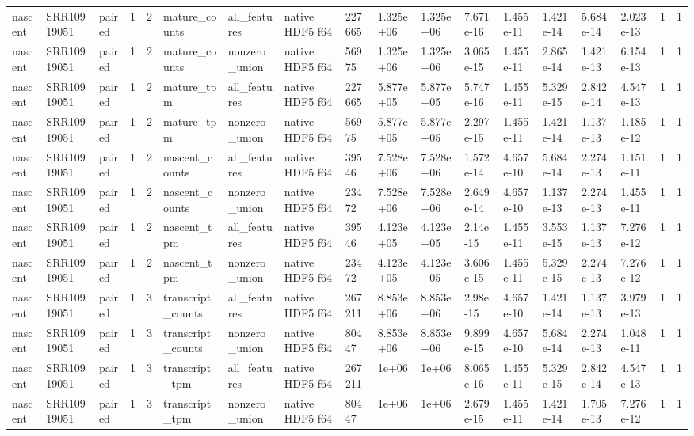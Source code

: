 \begin{tabular}{llllllllllllllllll}
nascent & SRR10919051 & paired & 1 & 2 & mature\_counts & all\_features & native HDF5 f64 & 227665 & 1.325e+06 & 1.325e+06 & 7.671e-16 & 1.455e-11 & 1.421e-14 & 5.684e-14 & 2.023e-13 & 1 & 1 \\
nascent & SRR10919051 & paired & 1 & 2 & mature\_counts & nonzero\_union & native HDF5 f64 & 56975 & 1.325e+06 & 1.325e+06 & 3.065e-15 & 1.455e-11 & 2.865e-14 & 1.421e-13 & 6.154e-13 & 1 & 1 \\
nascent & SRR10919051 & paired & 1 & 2 & mature\_tpm & all\_features & native HDF5 f64 & 227665 & 5.877e+05 & 5.877e+05 & 5.747e-16 & 1.455e-11 & 5.329e-15 & 2.842e-14 & 4.547e-13 & 1 & 1 \\
nascent & SRR10919051 & paired & 1 & 2 & mature\_tpm & nonzero\_union & native HDF5 f64 & 56975 & 5.877e+05 & 5.877e+05 & 2.297e-15 & 1.455e-11 & 1.421e-14 & 1.137e-13 & 1.185e-12 & 1 & 1 \\
nascent & SRR10919051 & paired & 1 & 2 & nascent\_counts & all\_features & native HDF5 f64 & 39546 & 7.528e+06 & 7.528e+06 & 1.572e-14 & 4.657e-10 & 5.684e-14 & 2.274e-13 & 1.151e-11 & 1 & 1 \\
nascent & SRR10919051 & paired & 1 & 2 & nascent\_counts & nonzero\_union & native HDF5 f64 & 23472 & 7.528e+06 & 7.528e+06 & 2.649e-14 & 4.657e-10 & 1.137e-13 & 2.274e-13 & 1.455e-11 & 1 & 1 \\
nascent & SRR10919051 & paired & 1 & 2 & nascent\_tpm & all\_features & native HDF5 f64 & 39546 & 4.123e+05 & 4.123e+05 & 2.14e-15 & 1.455e-11 & 3.553e-15 & 1.137e-13 & 7.276e-12 & 1 & 1 \\
nascent & SRR10919051 & paired & 1 & 2 & nascent\_tpm & nonzero\_union & native HDF5 f64 & 23472 & 4.123e+05 & 4.123e+05 & 3.606e-15 & 1.455e-11 & 5.329e-15 & 2.274e-13 & 7.276e-12 & 1 & 1 \\
nascent & SRR10919051 & paired & 1 & 3 & transcript\_counts & all\_features & native HDF5 f64 & 267211 & 8.853e+06 & 8.853e+06 & 2.98e-15 & 4.657e-10 & 1.421e-14 & 1.137e-13 & 3.979e-13 & 1 & 1 \\
nascent & SRR10919051 & paired & 1 & 3 & transcript\_counts & nonzero\_union & native HDF5 f64 & 80447 & 8.853e+06 & 8.853e+06 & 9.899e-15 & 4.657e-10 & 5.684e-14 & 2.274e-13 & 1.048e-11 & 1 & 1 \\
nascent & SRR10919051 & paired & 1 & 3 & transcript\_tpm & all\_features & native HDF5 f64 & 267211 & 1e+06 & 1e+06 & 8.065e-16 & 1.455e-11 & 5.329e-15 & 2.842e-14 & 4.547e-13 & 1 & 1 \\
nascent & SRR10919051 & paired & 1 & 3 & transcript\_tpm & nonzero\_union & native HDF5 f64 & 80447 & 1e+06 & 1e+06 & 2.679e-15 & 1.455e-11 & 1.421e-14 & 1.705e-13 & 7.276e-12 & 1 & 1 \\

\end{tabular}

